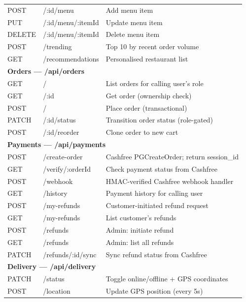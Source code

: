 \documentclass[11pt,a4paper,twoside]{book}
\begin{document}
\begin{center}
\begin{longtable}{p{1.5cm}p{5cm}p{6cm}}
POST & /:id/menu               & Add menu item \\
\rowcolor{rowalt}PUT  & /:id/menu/:itemId       & Update menu item \\
DELETE & /:id/menu/:itemId     & Delete menu item \\
\rowcolor{rowalt}POST & /trending               & Top 10 by recent order volume \\
GET  & /recommendations        & Personalised restaurant list \\
\midrule
\multicolumn{3}{l}{\textbf{Orders — /api/orders}} \\
\midrule
GET  & /                       & List orders for calling user's role \\
\rowcolor{rowalt}GET  & /:id                    & Get order (ownership check) \\
POST & /                       & Place order (transactional) \\
\rowcolor{rowalt}PATCH & /:id/status            & Transition order status (role-gated) \\
POST & /:id/reorder            & Clone order to new cart \\
\midrule
\multicolumn{3}{l}{\textbf{Payments — /api/payments}} \\
\midrule
POST & /create-order           & Cashfree PGCreateOrder; return session\_id \\
\rowcolor{rowalt}GET  & /verify/:orderId        & Check payment status from Cashfree \\
POST & /webhook                & HMAC-verified Cashfree webhook handler \\
\rowcolor{rowalt}GET  & /history                & Payment history for calling user \\
POST & /my-refunds             & Customer-initiated refund request \\
\rowcolor{rowalt}GET  & /my-refunds             & List customer's refunds \\
POST & /refunds                & Admin: initiate refund \\
\rowcolor{rowalt}GET  & /refunds                & Admin: list all refunds \\
PATCH & /refunds/:id/sync      & Sync refund status from Cashfree \\
\midrule
\multicolumn{3}{l}{\textbf{Delivery — /api/delivery}} \\
\midrule
PATCH & /status                & Toggle online/offline + GPS coordinates \\
\rowcolor{rowalt}POST & /location              & Update GPS position (every 5s) \\

\end{longtable}
\end{center}
\end{document}
